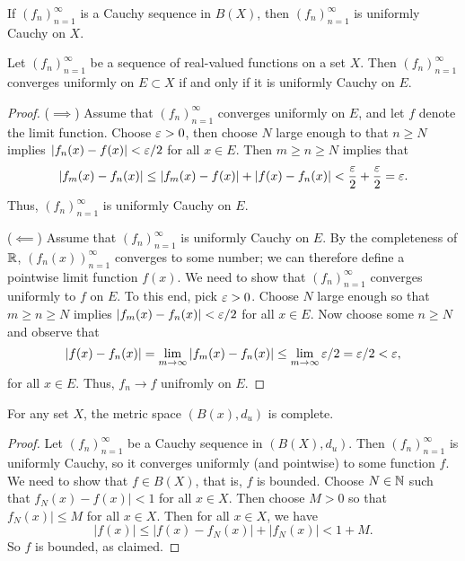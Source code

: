 \documentclass[12pt]{scrartcl} %
\begin{document}
\begin{proposition}
    If $(f_n)_{n=1}^{\infty}$ is a Cauchy sequence in $B(X)$, then $(f_n)_{n=1}^{\infty}$ is uniformly Cauchy on $X$.
\end{proposition}

\begin{theorem}
    Let $(f_n)_{n=1}^{\infty}$ be a sequence of real-valued functions on a set $X$. Then $(f_n)_{n=1}^{\infty}$ converges uniformly on $E \subset X$ if and only if it is uniformly Cauchy on $E$.
\end{theorem}

\begin{proof}
    ($\implies$) Assume that $(f_n)_{n=1}^{\infty}$ converges uniformly on $E$, and let $f$ denote the limit function. Choose $\varepsilon > 0$, then choose $N$ large enough to that $n \geq N$ implies $|f_n(x) - f(x)| < \varepsilon / 2$ for all $x \in E$. Then $m \geq n \geq N$ implies that \[|f_m(x) - f_n(x)| \leq |f_m(x) - f(x)| + |f(x) - f_n(x)| < \frac{\varepsilon}{2} + \frac{\varepsilon}{2} = \varepsilon.\] Thus, $(f_n)_{n=1}^{\infty}$ is uniformly Cauchy on $E$.

    ($\impliedby$) Assume that $(f_n)_{n=1}^{\infty}$ is uniformly Cauchy on $E$. By the completeness of $\mathbb{R}$, $(f_n(x))_{n=1}^{\infty}$ converges to some number; we can therefore define a pointwise limit function $f(x)$. We need to show that $(f_n)_{n=1}^{\infty}$ converges uniformly to $f$ on $E$. To this end, pick $\varepsilon > 0$. Choose $N$ large enough so that $m \geq n \geq N$ implies $|f_m(x) - f_n(x)| < \varepsilon / 2$ for all $x \in E$. Now choose some $n \geq N$ and observe that \[|f(x) - f_n(x)| = \lim_{m \to \infty}|f_m(x) - f_n(x)| \leq \lim_{m \to \infty} \varepsilon / 2 = \varepsilon / 2 < \varepsilon,\] for all $x \in E$. Thus, $f_n \to f$ unifromly on $E$.
\end{proof}

\begin{theorem}[Completeness of $B(X)$]
    For any set $X$, the metric space $(B(x), d_u)$ is complete.
\end{theorem}

\begin{proof}
    Let $(f_n)_{n=1}^{\infty}$ be a Cauchy sequence in $(B(X), d_u)$. Then $(f_n)_{n=1}^{\infty}$ is uniformly Cauchy, so it converges uniformly (and pointwise) to some function $f$. We need to show that $f \in B(X)$, that is, $f$ is bounded. Choose $N \in \mathbb{N}$ such that $f_N(x) - f(x)| < 1$ for all $x \in X$. Then choose $M > 0$ so that $f_N(x)| \leq M$ for all $x \in X$. Then for all $x \in X$, we have \[|f(x)| \leq |f(x) - f_N(x)| + |f_N(x)| < 1 + M.\] So $f$ is bounded, as claimed.
\end{proof}
\end{document}
